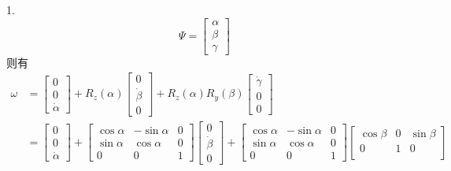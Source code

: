 \documentclass[UTF8, 13pt]{ctexart}
\begin{document}
1.
\[
\Psi = \begin{bmatrix}
        \alpha \\
        \beta \\
        \gamma
        \end{bmatrix}
\]
则有
\[
\begin{aligned}
    \omega &= \begin{bmatrix}
                0 \\
                0 \\
                \dot{\alpha}
            \end{bmatrix}
            + R_z(\alpha)
            \begin{bmatrix}
                0 \\
                \dot{\beta} \\
                0
            \end{bmatrix}
            + R_z(\alpha)R_y(\beta)
            \begin{bmatrix}
                \dot{\gamma} \\
                0 \\
                0
            \end{bmatrix} \\
    &= \begin{bmatrix}
        0 \\
        0 \\
        \dot{\alpha}
        \end{bmatrix}
        + \begin{bmatrix}
            \cos\alpha & -\sin\alpha & 0 \\
            \sin\alpha & \cos\alpha & 0 \\
            0 & 0 & 1
        \end{bmatrix}
        \begin{bmatrix}
            0 \\
            \dot{\beta} \\
            0
        \end{bmatrix}
        + \begin{bmatrix}
            \cos\alpha & -\sin\alpha & 0 \\
            \sin\alpha & \cos\alpha & 0 \\
            0 & 0 & 1
        \end{bmatrix}
        \begin{bmatrix}
            \cos\beta & 0 & \sin\beta \\
            0 & 1 & 0 \\

\end{bmatrix}
\end{aligned}\]
\end{document}
